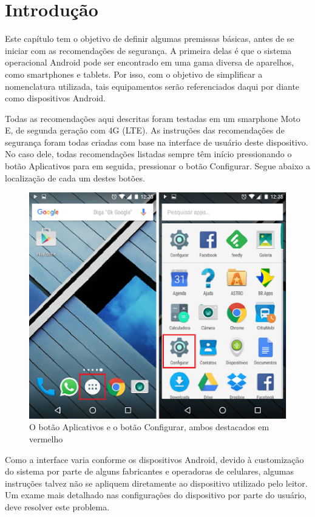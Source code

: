 \chapter{Introdu\c c\~ao}

Este cap\'itulo tem o objetivo de definir algumas premissas b\'asicas, antes de se iniciar com as recomenda\c c\~oes de seguran\c ca. A primeira delas \'e que o sistema operacional Android pode ser encontrado em uma gama diversa de aparelhos, como smartphones e tablets. Por isso, com o objetivo de simplificar a nomenclatura utilizada, tais equipamentos ser\~ao referenciados daqui por diante como dispositivos Android. 

Todas as recomenda\c c\~oes aqui descritas foram testadas em um smarphone Moto E, de segunda gera\c c\~ao com 4G (LTE). As instru\c c\~oes das recomenda\c c\~oes de seguran\c ca foram todas criadas com base na interface de usu\'ario deste dispositivo. No caso dele, todas recomenda\c c\~oes listadas sempre t\^em in\'icio pressionando o bot\~ao Aplicativos para em seguida, pressionar o bot\~ao Configurar. Segue abaixo a localiza\c c\~ao de cada um destes bot\~oes.

\begin{figure}[h]
  \centering
  \includegraphics{imagem1.eps}
  \caption{O bot\~ao Aplicativos e o bot\~ao Configurar, ambos destacados em vermelho}
\end{figure}

Como a interface varia conforme os dispositivos Android, devido \`a customiza\c c\~ao do sistema por parte de alguns fabricantes e operadoras de celulares, algumas instru\c c\~oes talvez n\~ao se apliquem diretamente ao dispositivo utilizado pelo leitor. Um exame mais detalhado nas configura\c c\~oes do dispositivo por parte do usu\'ario, deve resolver este problema.   

